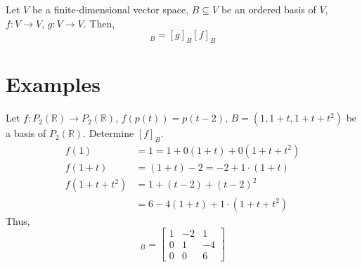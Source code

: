 \documentclass[letterpaper,12pt]{article}
\begin{document}
\begin{corollary}
Let $V$ be a finite-dimensional vector space, $B \subseteq V$ be an ordered basis of $V$, $f: V \rightarrow V$, $g: V \rightarrow V$. Then,
\begin{equation*}
    [g \circ f]_{B} = [g]_{B} [f]_{B}
\end{equation*}
\end{corollary}










\section*{Examples}
\begin{example}
Let $f: P_2(\mathbb{R}) \rightarrow P_2(\mathbb{R})$, $f(p(t)) = p(t - 2)$, $B = (1, 1 + t, 1 + t + t^2)$ be a basis of $P_2(\mathbb{R})$. Determine $[f]_{B}$.
\begin{align*}
    f(1) & = 1 = 1 + 0(1 + t) + 0(1 + t + t^2) \\
    f(1 + t) & = (1 + t) - 2 = -2 + 1 \cdot (1 + t) \\
    f(1 + t + t^2) & = 1 + (t - 2) + (t - 2)^2 \\
    & = 6 - 4(1 + t) + 1 \cdot (1 + t + t^2)
\end{align*}
Thus,
\begin{equation*}
    [f]_{B} = \begin{bmatrix} 1 & -2 & 1 \\ 0 & 1 & -4 \\ 0 & 0 & 6 \end{bmatrix}
\end{equation*}
\end{example}

\begin{example}

\end{example}
\end{document}
